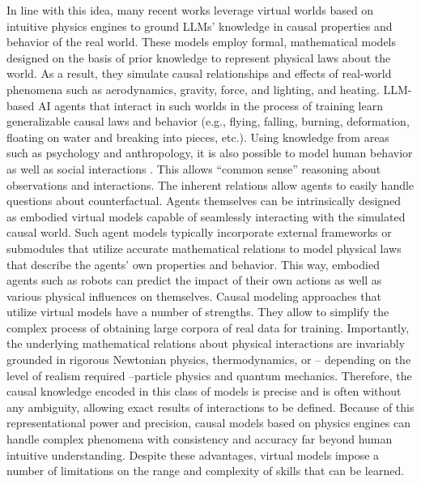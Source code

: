 \documentclass[10pt,journal,compsoc]{IEEEtran}
\begin{document}
\begin{table}[h!]
{} %
\end{table}
	
	In line with this idea, many recent works \cite{duan2022survey,ahmed2020causalworld,baradel2019cophy} leverage virtual worlds based on intuitive physics engines \cite{cherian2024llmphy,xue2024phyt2v,zhaobridging} to ground LLMs’ knowledge in causal properties and behavior of the real world. These models employ formal, mathematical models designed on the basis of prior knowledge to represent physical laws about the world. As a result, they simulate causal relationships and effects of real-world phenomena such as aerodynamics, gravity, force, and lighting, and heating. LLM-based AI agents that interact in such worlds in the process of training learn generalizable causal laws and behavior (e.g., flying, falling, burning, deformation, floating on water and breaking into pieces, etc.). Using knowledge from areas such as psychology and anthropology, it is also possible to model human behavior as well as social interactions \cite{gui2023challenge,gurcan2024llm}. This allows “common sense” reasoning about observations and interactions. The inherent relations allow agents to easily handle questions about counterfactual. Agents themselves can be intrinsically designed as embodied virtual models capable of seamlessly interacting with the simulated causal world. Such agent models typically incorporate external frameworks or submodules that utilize accurate mathematical relations to model physical laws that describe the agents’ own properties and behavior. This way, embodied agents such as robots can predict the impact of their own actions as well as various physical influences on themselves. 
	Causal modeling approaches that utilize virtual models have a number of strengths. They allow to simplify the complex process of obtaining large corpora of real data for training. Importantly, the underlying mathematical relations about physical interactions are invariably grounded in rigorous Newtonian physics, thermodynamics, or – depending on the level of realism required –particle physics and quantum mechanics. Therefore, the causal knowledge encoded in this class of models is precise and is often without any ambiguity, allowing exact results of interactions to be defined. Because of this representational power and precision, causal models based on physics engines can handle complex phenomena with consistency and accuracy far beyond human intuitive understanding. Despite these advantages, virtual models impose a number of limitations on the range and complexity of skills that can be learned.
	
\end{document}
